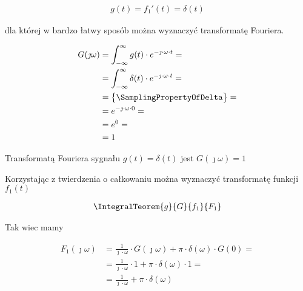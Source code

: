 \begin{task}
\begin{align*}
g(t) = f_1'(t) = \delta(t)
\end{align*}

\begin{figure}[H]
  \centering
\end{figure}

dla której w bardzo łatwy sposób można wyznaczyć transformatę Fouriera.

\begin{align*}
G(\jmath \omega) &= \int_{-\infty}^{\infty} g(t) \cdot e^{-\jmath \cdot \omega \cdot t}=\\
&=\int_{-\infty}^{\infty} \delta(t) \cdot e^{-\jmath \cdot \omega \cdot t}=\\
&=\begin{Bmatrix}
\SamplingPropertyOfDelta
\end{Bmatrix}=\\
&=e^{-\jmath \cdot \omega \cdot 0}=\\
&=e^{0}=\\
&=1
\end{align*}

Transformatą Fouriera sygnału $g(t)=\delta(t)$ jest $G(\jmath \omega)=1$

Korzystając z twierdzenia o całkowaniu można wyznaczyć transformatę funkcji $f_1(t)$

\begin{align*}
\IntegralTeorem{g}{G}{f_1}{F_1}
\end{align*}

Tak wiec mamy

\begin{align*}
F_1(\jmath \omega)&=\frac{1}{\jmath \cdot \omega } \cdot G(\jmath \omega) + \pi \cdot \delta(\omega) \cdot G(0)=\\
&=\frac{1}{\jmath \cdot \omega } \cdot 1 + \pi \cdot \delta(\omega) \cdot 1=\\
&=\frac{1}{\jmath \cdot \omega } + \pi \cdot \delta(\omega)
\end{align*}


\end{task}
